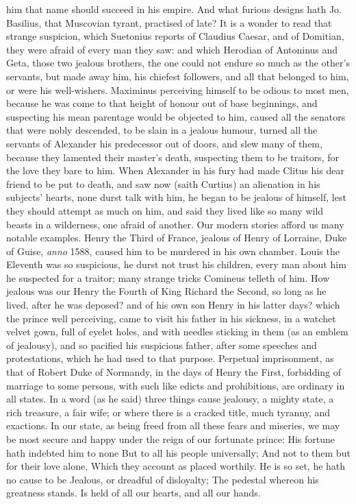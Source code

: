 {him that name should succeed in his empire. And what furious designs
hath Jo. Basilius, that Muscovian tyrant, practised of late? It
is a wonder to read that strange suspicion, which Suetonius reports of
Claudius Caesar, and of Domitian, they were afraid of every man they
saw: and which Herodian of Antoninus and Geta, those two jealous
brothers, the one could not endure so much as the other's servants, but
made away him, his chiefest followers, and all that belonged to him, or
were his well-wishers. Maximinus perceiving himself to be odious
to most men, because he was come to that height of honour out of base
beginnings, and suspecting his mean parentage would be objected to him,
caused all the senators that were nobly descended, to be slain in a
jealous humour, turned all the servants of Alexander his predecessor
out of doors, and slew many of them, because they lamented their
master's death, suspecting them to be traitors, for the love they bare
to him. When Alexander in his fury had made Clitus his dear friend to
be put to death, and saw now (saith Curtius) an alienation in his
subjects' hearts, none durst talk with him, he began to be jealous of
himself, lest they should attempt as much on him, and said they lived
like so many wild beasts in a wilderness, one afraid of another. Our
modern stories afford us many notable examples. Henry the Third
of France, jealous of Henry of Lorraine, Duke of Guise, \emph{anno} 1588,
caused him to be murdered in his own chamber. Louis the Eleventh
was so suspicious, he durst not trust his children, every man about him
he suspected for a traitor; many strange tricks Comineus telleth of
him. How jealous was our Henry the Fourth of King Richard the
Second, so long as he lived, after he was deposed? and of his own son
Henry in his latter days? which the prince well perceiving, came to
visit his father in his sickness, in a watchet velvet gown, full of
eyelet holes, and with needles sticking in them (as an emblem of
jealousy), and so pacified his suspicious father, after some speeches
and protestations, which he had used to that purpose. Perpetual
imprisonment, as that of Robert Duke of Normandy, in the days of
Henry the First, forbidding of marriage to some persons, with such like
edicts and prohibitions, are ordinary in all states. In a word
(as he said) three things cause jealousy, a mighty state, a rich
treasure, a fair wife; or where there is a cracked title, much tyranny,
and exactions. In our state, as being freed from all these fears and
miseries, we may be most secure and happy under the reign of our
fortunate prince:
His fortune hath indebted him to none
But to all his people universally;
And not to them but for their love alone,
Which they account as placed worthily.
He is so set, he hath no cause to be
Jealous, or dreadful of disloyalty;
The pedestal whereon his greatness stands.
Is held of all our hearts, and all our hands.

}
